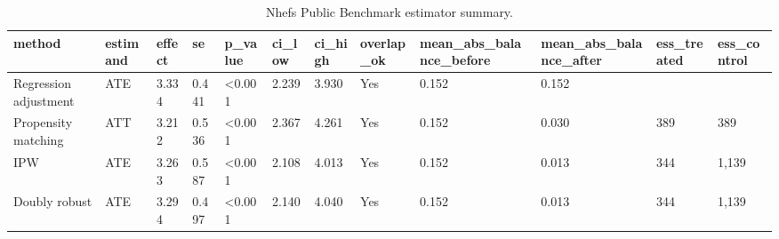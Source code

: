\begin{table}
\caption{Nhefs Public Benchmark estimator summary.}
\label{tab:nhefs_public_benchmark-estimators}
\begin{tabular}{llllllllllll}
\toprule
method & estimand & effect & se & p_value & ci_low & ci_high & overlap_ok & mean_abs_balance_before & mean_abs_balance_after & ess_treated & ess_control \\
\midrule
Regression adjustment & ATE & 3.334 & 0.441 & <0.001 & 2.239 & 3.930 & Yes & 0.152 & 0.152 &  &  \\
Propensity matching & ATT & 3.212 & 0.536 & <0.001 & 2.367 & 4.261 & Yes & 0.152 & 0.030 & 389 & 389 \\
IPW & ATE & 3.263 & 0.587 & <0.001 & 2.108 & 4.013 & Yes & 0.152 & 0.013 & 344 & 1,139 \\
Doubly robust & ATE & 3.294 & 0.497 & <0.001 & 2.140 & 4.040 & Yes & 0.152 & 0.013 & 344 & 1,139 \\
\bottomrule
\end{tabular}
\end{table}
